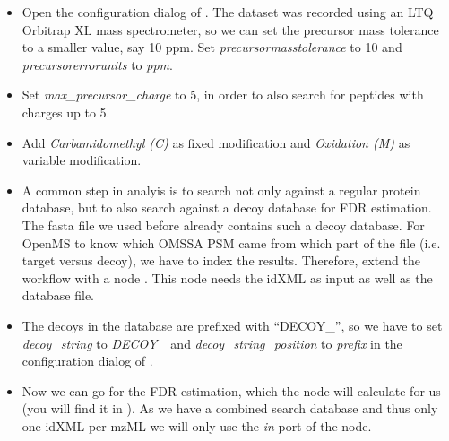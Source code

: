 \begin{itemize}
\item
Open the configuration dialog of .
The dataset was recorded using an LTQ Orbitrap XL mass spectrometer, so we can set the precursor mass tolerance to a smaller value, say 10 ppm.
Set \textit{precursor\textunderscore mass\textunderscore tolerance} to 10 and \\ \textit{precursor\textunderscore error\textunderscore units} to \textit{ppm}.
\item
Set \textit{max\_precursor\_charge} to 5, in order to also search for peptides with charges up to 5.
\item
Add \textit{Carbamidomethyl (C)} as fixed modification and \textit{Oxidation (M)} as variable modification.
\item
A common step in analyis is to search not only against a regular protein database, but to also search against a decoy database for FDR estimation.
The fasta file we used before already contains such a decoy database.
For OpenMS to know which OMSSA PSM came from which part of the file (i.e. target versus decoy), we have to index the results.
Therefore, extend the workflow with a  node .
This node needs the idXML as input as well as the database file.
\item
The decoys in the database are prefixed with ``DECOY\_'', so we have to set \textit{decoy\_string} to \textit{DECOY\_} and \textit{decoy\_string\_position} to \textit{prefix} in the configuration dialog of .
\item
Now we can go for the FDR estimation, which the  node will calculate for us (you will find it in ).
As we have a combined search database and thus only one idXML per mzML we will only use the \textit{in} port of the  node.

\end{itemize}
